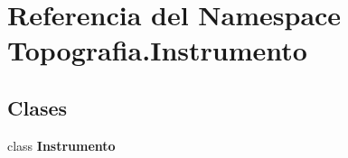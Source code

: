 \section{Referencia del Namespace Topografia.\-Instrumento}
\label{namespaceTopografia_1_1Instrumento}
\subsection*{Clases}
\begin{DoxyCompactItemize}
\item 
class {\bf Instrumento}
\end{DoxyCompactItemize}
